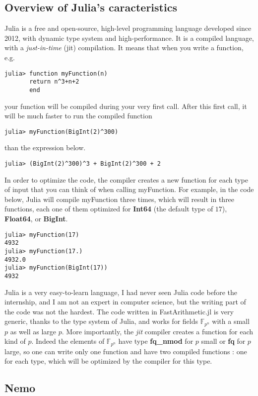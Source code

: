 \documentclass[a4paper,11pt]{article}
\theoremstyle{break}
\theoremstyle{definition}
\theoremstyle{remark}
\begin{document}
\subsection{Overview of Julia's caracteristics}
Julia is a free and open-source, high-level programming language developed since 
2012, with dynamic
type system and high-performance. It is a compiled language, with a
\emph{just-in-time} (jit) compilation. It means that when you write a
function, e.g. 
\begin{verbatim}
julia> function myFunction(n)
       return n^3+n+2
       end
\end{verbatim}
your function will be compiled during your very first call. After this first
call, it will be much faster to run the compiled function
\begin{verbatim}
julia> myFunction(BigInt(2)^300)
\end{verbatim}
than the expression below.
\begin{verbatim}
julia> (BigInt(2)^300)^3 + BigInt(2)^300 + 2
\end{verbatim}
In order to optimize the code, the compiler creates a new function for each
type of input that you can think of when calling myFunction. For example, in the
code 
below, Julia will compile myFunction three times, which will result in
three functions, each one of them optimized for \textbf{Int64} (the default type
of $17$), \textbf{Float64}, or \textbf{BigInt}.
\begin{verbatim}
julia> myFunction(17)
4932
julia> myFunction(17.)
4932.0
julia> myFunction(BigInt(17))
4932
\end{verbatim}
Julia is a very easy-to-learn language, I had never seen Julia code before the 
internship, and I am not an expert in computer science, but the writing part of
the code was not the hardest. 
The code written in FastArithmetic.jl is
very generic, thanks to the type system of Julia, and works for fields
$\mathbb{F}_{p^n}$ with a small $p$ as well as large $p$. More importantly, the
\emph{jit} compiler creates a function for each kind of $p$. Indeed the elements
of $\mathbb{F}_{p^n}$ have type \textbf{fq\_nmod} for $p$ small or \textbf{fq}
for $p$ large, so one can write only one function and have two compiled
functions : one for each type, which will be optimized by the compiler for this 
type.

\subsection{Nemo}
\end{document}
